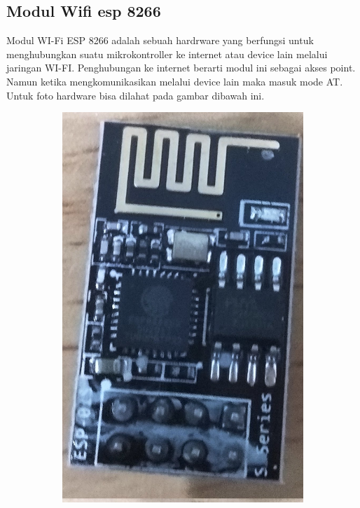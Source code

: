 \documentclass[11pt]{article}
\numberwithin{equation}{subsection}
\begin{document}
\subsection{Modul Wifi esp 8266}
Modul WI-Fi ESP 8266 adalah sebuah hardrware yang berfungsi untuk menghubungkan suatu mikrokontroller ke internet atau device lain melalui jaringan WI-FI.
Penghubungan ke internet berarti modul ini sebagai akses point.
Namun ketika mengkomunikasikan melalui device lain maka masuk mode AT.
Untuk foto hardware bisa dilahat pada gambar dibawah ini.
\begin{figure}[h!]
	\centering
	\begin{subfigure}[b]{0.39\linewidth}
		\includegraphics[width=\linewidth]{dokumentasi/ESP8266/wifi2.jpg}

\end{subfigure}
\end{figure}
\end{document}
